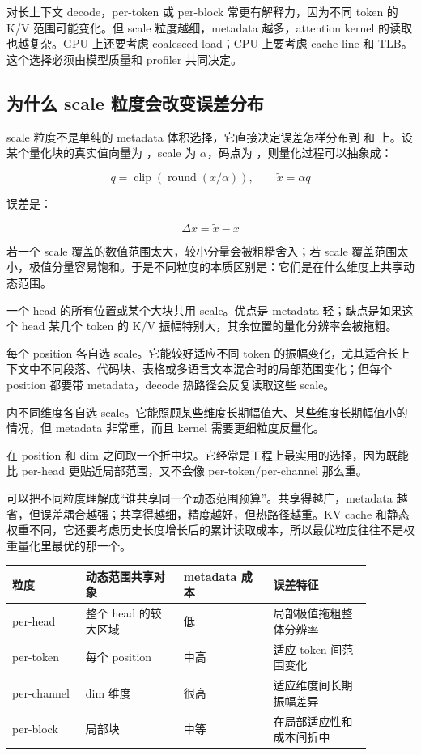 对长上下文 decode，per-token 或 per-block 常更有解释力，因为不同 token 的 K/V 范围可能变化。但 scale 粒度越细，metadata 越多，attention kernel 的读取也越复杂。GPU 上还要考虑 coalesced load；CPU 上要考虑 cache line 和 TLB。这个选择必须由模型质量和 profiler 共同决定。

\subsection{为什么 scale 粒度会改变误差分布}

scale 粒度不是单纯的 metadata 体积选择，它直接决定误差怎样分布到  和  上。设某个量化块的真实值向量为 ，scale 为 \(\alpha\)，码点为 ，则量化过程可以抽象成：

\[
q = \operatorname{clip}\left(\operatorname{round}(x / \alpha)\right),\qquad
\tilde{x} = \alpha q
\]

误差是：

\[
\Delta x = \tilde{x} - x
\]

若一个 scale 覆盖的数值范围太大，较小分量会被粗糙舍入；若 scale 覆盖范围太小，极值分量容易饱和。于是不同粒度的本质区别是：它们是在什么维度上共享动态范围。

 一个 head 的所有位置或某个大块共用 scale。优点是 metadata 轻；缺点是如果这个 head 某几个 token 的 K/V 振幅特别大，其余位置的量化分辨率会被拖粗。

 每个 position 各自选 scale。它能较好适应不同 token 的振幅变化，尤其适合长上下文中不同段落、代码块、表格或多语言文本混合时的局部范围变化；但每个 position 都要带 metadata，decode 热路径会反复读取这些 scale。

  内不同维度各自选 scale。它能照顾某些维度长期幅值大、某些维度长期幅值小的情况，但 metadata 非常重，而且 kernel 需要更细粒度反量化。

 在 position 和 dim 之间取一个折中块。它经常是工程上最实用的选择，因为既能比 per-head 更贴近局部范围，又不会像 per-token/per-channel 那么重。

可以把不同粒度理解成“谁共享同一个动态范围预算”。共享得越广，metadata 越省，但误差耦合越强；共享得越细，精度越好，但热路径越重。KV cache 和静态权重不同，它还要考虑历史长度增长后的累计读取成本，所以最优粒度往往不是权重量化里最优的那一个。

\begin{center}
\begin{tabular}{p{0.18\linewidth}p{0.24\linewidth}p{0.22\linewidth}p{0.24\linewidth}}
\toprule
粒度 & 动态范围共享对象 & metadata 成本 & 误差特征 \\
\midrule
per-head & 整个 head 的较大区域 & 低 & 局部极值拖粗整体分辨率 \\
per-token & 每个 position & 中高 & 适应 token 间范围变化 \\
per-channel & dim 维度 & 很高 & 适应维度间长期振幅差异 \\
per-block & 局部块 & 中等 & 在局部适应性和成本间折中 \\
\bottomrule
\end{tabular}
\end{center}

